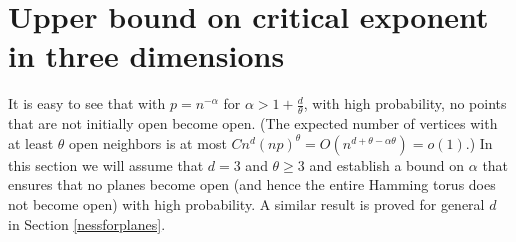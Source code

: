 \documentclass{amsart}
\newcommand{\threshold}{\theta}
\numberwithin{equation}{section}
\theoremstyle{definition}
\theoremstyle{remark}
\begin{document}
\section{Upper bound on critical exponent in three dimensions}
\label{3d-upper}
It is easy to see that with $p = n^{-\alpha}$ for $\alpha > 1 + \frac{d}{\threshold}$, with high probability, no points that are not initially open become open.  (The expected number of vertices with at least $\threshold$ open neighbors is at most $Cn^d (np)^\threshold = O(n^{d+\threshold - \alpha\threshold}) = o(1)$.)
In this section we will assume that $d=3$ and $\theta \ge 3$ and establish a bound on $\alpha$ that 
ensures that no planes become open (and hence the entire Hamming torus does not become open) 
with high probability. A similar
result is proved for general $d$ in Section \ref{nessforplanes}.
\end{document}
